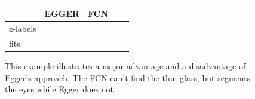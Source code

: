 \begin{figure}
\begin{center}
\begin{tabular}{m{1.3cm}|SC|SC}
	& EGGER & FCN \\ \hline
	z-labels &  &
	\\ \hline
	fits &  & 
	 \\
\end{tabular}
\caption{This example illustrates a major advantage and a disadvantage of Egger's approach. The FCN can't find the thin glass, but segments the eyes while Egger does not.}
\label{fig:chap4:harry}
\end{center}
\end{figure}

